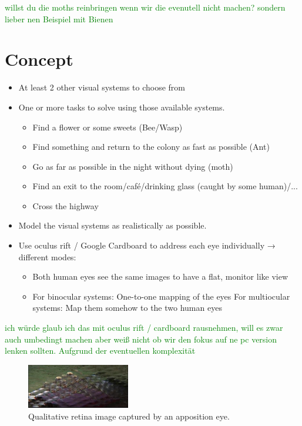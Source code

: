 \documentclass{acm_proc_article-sp}
\newcommand{\sebastian}[1]{\textcolor{Green}{#1}}
\begin{document}
\sebastian{willst du die moths reinbringen wenn wir die evenutell nicht machen? sondern lieber nen Beispiel mit Bienen}



\section{Concept}
\begin{itemize}
\item At least 2 other visual systems to choose from
\item One or more tasks to solve using those available systems.
  \begin{itemize}
    \item Find a flower or some sweets (Bee/Wasp)
    \item Find something and return to the colony as fast as possible (Ant)
    \item Go as far as possible in the night without dying (moth)
    \item Find an exit to the room/café/drinking glass (caught by some human)/...
    \item Cross the highway
  \end{itemize}
\item Model the visual systems as realistically as possible.
\item Use oculus rift / Google Cardboard to address each eye individually
→ different modes:
  \begin{itemize}
  \item Both human eyes see the same images to have a flat, monitor like view
  \item For binocular systems: One-to-one mapping of the eyes
        For multiocular systems: Map them somehow to the two human eyes
  \end{itemize}
\end{itemize}

\sebastian{ich würde glaub ich das mit oculus rift / cardboard rausnehmen, will es zwar auch umbedingt machen aber weiß nicht ob wir den fokus auf ne pc version lenken sollten. Aufgrund der eventuellen komplexität}



\begin{figure}
  \centering
  \includegraphics[width=0.4\textwidth]{bee-vision.jpg}
  \caption{Qualitative retina image captured by an apposition eye.}
  \label{appositeeye}
\end{figure}
\end{document}
